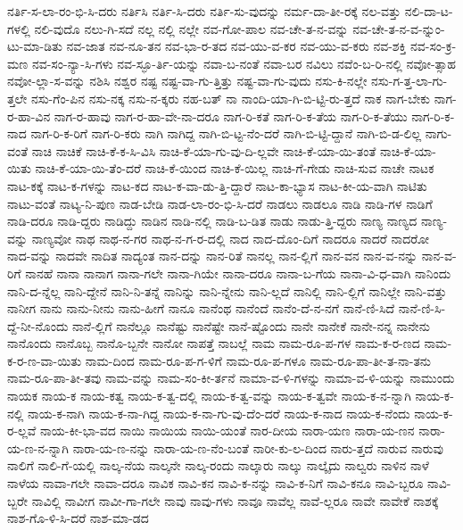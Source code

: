 {ನರ್ತಿ-ಸ-ಲಾ-ರಂ-ಭಿ-ಸಿ-ದರು
ನರ್ತಿಸಿ
ನರ್ತಿ-ಸಿ-ದರು
ನರ್ತಿ-ಸು-ವುದನ್ನು
ನರ್ಮ-ದಾ-ತೀ-ರಕ್ಕೆ
ನಲ-ವತ್ತು
ನಲಿ-ದಾ-ಟ-ಗಳಲ್ಲಿ
ನಲಿ-ವುದೊ
ನಲು-ಗಿ-ಸದೆ
ನಲ್ಲ
ನಲ್ಲಿ
ನಲ್ಲೇ
ನವ-ಗೋ-ಪಾಲ
ನವ-ಚೇ-ತ-ನ-ವನ್ನು
ನವ-ಚೇ-ತ-ನ-ವ-ನ್ನುಂ-ಟು-ಮಾ-ಡಿತು
ನವ-ಜಾತ
ನವ-ನೂ-ತನ
ನವ-ಭಾ-ರ-ತದ
ನವ-ಯು-ವ-ಕರ
ನವ-ಯು-ವ-ಕರು
ನವ-ಶಕ್ತಿ
ನವ-ಸಂ-ಕ್ರ-ಮಣ
ನವ-ಸಂ-ನ್ಯಾ-ಸಿ-ಗಳು
ನವ-ಸ್ಫೂ-ರ್ತಿ-ಯನ್ನು
ನವಾ-ಬ-ನಂತೆ
ನವಾ-ಬರ
ನವಿಲು
ನವೆಂ-ಬ-ರಿ-ನಲ್ಲಿ
ನವೋ-ತ್ಸಾಹ
ನವೋ-ಲ್ಲಾ-ಸ-ವನ್ನು
ನಶಿಸಿ
ನಶ್ವರ
ನಷ್ಟ
ನಷ್ಟ-ವಾ-ಗು-ತ್ತಿತ್ತು
ನಷ್ಟ-ವಾ-ಗು-ವುದು
ನಸು-ಕಿ-ನಲ್ಲೇ
ನಸು-ಗ-ತ್ತ-ಲಾ-ಗು-ತ್ತಲೇ
ನಸು-ಗೆಂ-ಪಿನ
ನಸು-ನಕ್ಕ
ನಸು-ನ-ಕ್ಕರು
ನಹ-ಬತ್
ನಾ
ನಾಂದಿ-ಯಾ-ಗಿ-ಬಿ-ಟ್ಟಿ-ರು-ತ್ತದೆ
ನಾಕ
ನಾಗ-ಬೇಕು
ನಾಗ-ರ-ಹಾ-ವಿನ
ನಾಗ-ರ-ಹಾವು
ನಾಗ-ರ-ಹಾ-ವೇ-ನಾ-ದರೂ
ನಾಗ-ರಿ-ಕತೆ
ನಾಗ-ರಿ-ಕ-ತೆಯ
ನಾಗ-ರಿ-ಕ-ತೆಯು
ನಾಗ-ರಿ-ಕ-ನಾದ
ನಾಗ-ರಿ-ಕ-ರಿಗೆ
ನಾಗ-ರಿ-ಕರು
ನಾಗಿ
ನಾಗಿದ್ದ
ನಾಗಿ-ಬಿ-ಟ್ಟ-ನೆಂ-ದರೆ
ನಾಗಿ-ಬಿ-ಟ್ಟಿ-ದ್ದಾನೆ
ನಾಗಿ-ಬಿ-ಡ-ಲಿಲ್ಲ
ನಾಗು-ವಂತೆ
ನಾಚಿ
ನಾಚಿಕೆ
ನಾಚಿ-ಕೆ-ಕ-ಸಿ-ವಿಸಿ
ನಾಚಿ-ಕೆ-ಯಾ-ಗು-ವು-ದಿ-ಲ್ಲವೇ
ನಾಚಿ-ಕೆ-ಯಾ-ಯಿ-ತಂತೆ
ನಾಚಿ-ಕೆ-ಯಾ-ಯಿತು
ನಾಚಿ-ಕೆ-ಯಾ-ಯಿ-ತೆಂ-ದರೆ
ನಾಚಿ-ಕೆ-ಯಿಂದ
ನಾಚಿ-ಕೆ-ಯಿಲ್ಲ
ನಾಚಿ-ಗೆ-ಗೇಡು
ನಾಚಿ-ಸುವ
ನಾಚೇ
ನಾಟಕ
ನಾಟ-ಕಕ್ಕೆ
ನಾಟ-ಕ-ಗಳನ್ನು
ನಾಟ-ಕದ
ನಾಟ-ಕ-ವಾ-ಡು-ತ್ತಿ-ದ್ದಾರೆ
ನಾಟ-ಕಾ-ಭ್ಯಾಸ
ನಾಟ-ಕೀ-ಯ-ವಾಗಿ
ನಾಟಿತು
ನಾಟು-ವಂತೆ
ನಾಟ್ಯ-ನಿ-ಪುಣ
ನಾಡ-ಬೇಡಿ
ನಾಡ-ಲಾ-ರಂ-ಭಿ-ಸಿ-ದರೆ
ನಾಡಲು
ನಾಡಲೂ
ನಾಡಿ
ನಾಡಿ-ಗಳ
ನಾಡಿಗೆ
ನಾಡಿ-ದರೂ
ನಾಡಿ-ದ್ದರು
ನಾಡಿದ್ದು
ನಾಡಿನ
ನಾಡಿ-ನಲ್ಲಿ
ನಾಡಿ-ಬ-ಡಿತ
ನಾಡು
ನಾಡು-ತ್ತಿ-ದ್ದರು
ನಾಣ್ಯ
ನಾಣ್ಯದ
ನಾಣ್ಯ-ವನ್ನು
ನಾಣ್ಯವೋ
ನಾಥ
ನಾಥ-ನ-ಗರ
ನಾಥ-ನ-ಗ-ರ-ದಲ್ಲಿ
ನಾದ
ನಾದ-ದೊಂ-ದಿಗೆ
ನಾದರೂ
ನಾದರೆ
ನಾದರೋ
ನಾದ-ವನ್ನು
ನಾದವೇ
ನಾದಿತ
ನಾದ್ಯಂತ
ನಾನ-ದನ್ನು
ನಾನ-ರಿತೆ
ನಾನಲ್ಲ
ನಾನ-ಲ್ಲಿಗೆ
ನಾನ-ವನ
ನಾನ-ವ-ನನ್ನು
ನಾನ-ವ-ರಿಗೆ
ನಾನಹೆ
ನಾನಾ
ನಾನಾಗ
ನಾನಾ-ಗಲೇ
ನಾನಾ-ಗಿಯೇ
ನಾನಾ-ದರೂ
ನಾನಾ-ಬ-ಗೆಯ
ನಾನಾ-ವಿ-ಧ-ವಾಗಿ
ನಾನಿಂದು
ನಾನಿ-ದ-ನ್ನೆಲ್ಲ
ನಾನಿ-ದ್ದೇನೆ
ನಾನಿ-ನಿ-ತನ್ನೆ
ನಾನಿನ್ನು
ನಾನಿ-ನ್ನೇನು
ನಾನಿ-ಲ್ಲದೆ
ನಾನಿಲ್ಲಿ
ನಾನಿ-ಲ್ಲಿಗೆ
ನಾನಿಲ್ಲೇ
ನಾನಿ-ವತ್ತು
ನಾನೀಗ
ನಾನು
ನಾನು-ನೀನು
ನಾನು-ಹೀಗೆ
ನಾನೂ
ನಾನೆಂಥ
ನಾನೆಂದೆ
ನಾನೆಂ-ದೆ-ನ-ನಗೆ
ನಾನೆ-ಣಿ-ಸಿದೆ
ನಾನೆ-ಣಿ-ಸಿ-ದ್ದೆ-ನೀ-ನೊಂದು
ನಾನೆ-ಲ್ಲಿಗೆ
ನಾನೆಲ್ಲೂ
ನಾನೆಷ್ಟು
ನಾನೆಷ್ಟೇ
ನಾನೆ-ಷ್ಟೊಂದು
ನಾನೇ
ನಾನೇಕೆ
ನಾನೇ-ನನ್ನ
ನಾನೇನು
ನಾನೊಂದು
ನಾನೊಬ್ಬ
ನಾನೊ-ಬ್ಬನೇ
ನಾನೋ
ನಾಪತ್ತೆ
ನಾಬಲ್ಲೆ
ನಾಮ
ನಾಮ-ರೂ-ಪ-ಗಳ
ನಾಮ-ಕ-ರ-ಣದ
ನಾಮ-ಕ-ರ-ಣ-ವಾ-ಯಿತು
ನಾಮ-ದಿಂದ
ನಾಮ-ರೂ-ಪ-ಗ-ಳಿಗೆ
ನಾಮ-ರೂ-ಪ-ಗಳೂ
ನಾಮ-ರೂ-ಪಾ-ತೀ-ತ-ನಾ-ತನು
ನಾಮ-ರೂ-ಪಾ-ತೀ-ತವು
ನಾಮ-ವನ್ನು
ನಾಮ-ಸಂ-ಕೀ-ರ್ತನೆ
ನಾಮಾ-ವ-ಳಿ-ಗಳನ್ನು
ನಾಮಾ-ವ-ಳಿ-ಯನ್ನು
ನಾಮುಂದು
ನಾಯಕ
ನಾಯ-ಕ
ನಾಯ-ಕತ್ವ
ನಾಯ-ಕ-ತ್ವ-ದಲ್ಲಿ
ನಾಯ-ಕ-ತ್ವ-ವನ್ನು
ನಾಯ-ಕ-ತ್ವವೇ
ನಾಯ-ಕ-ನ-ನ್ನಾಗಿ
ನಾಯ-ಕ-ನಲ್ಲಿ
ನಾಯ-ಕ-ನಾಗಿ
ನಾಯ-ಕ-ನಾ-ಗಿದ್ದ
ನಾಯ-ಕ-ನಾ-ಗು-ವು-ದೆಂ-ದರೆ
ನಾಯ-ಕ-ನಾದ
ನಾಯ-ಕ-ನೆಂದು
ನಾಯ-ಕ-ರ-ಲ್ಲವೆ
ನಾಯ-ಕೀ-ಭಾ-ವದ
ನಾಯಿ
ನಾಯಿಯ
ನಾಯಿ-ಯಂತೆ
ನಾರ-ದೀಯ
ನಾರಾ-ಯಣ
ನಾರಾ-ಯ-ಣನ
ನಾರಾ-ಯ-ಣ-ನ-ನ್ನಾಗಿ
ನಾರಾ-ಯ-ಣ-ನನ್ನು
ನಾರಾ-ಯ-ಣ-ನೆಂ-ಬಂತೆ
ನಾರೀ-ಕು-ಲ-ದಿಂದ
ನಾರು-ತ್ತದೆ
ನಾರುವ
ನಾರುವು
ನಾಲಿಗೆ
ನಾಲಿ-ಗೆ-ಯಲ್ಲಿ
ನಾಲ್ಕ-ನೆಯ
ನಾಲ್ಕನೇ
ನಾಲ್ಕ-ರಂದು
ನಾಲ್ಕಾರು
ನಾಲ್ಕು
ನಾಲ್ಕೈದು
ನಾಲ್ವರು
ನಾಳಿನ
ನಾಳೆ
ನಾಳೆಯ
ನಾವಾ-ಗಲೇ
ನಾವಾ-ದರೂ
ನಾವಿಕ
ನಾವಿ-ಕನ
ನಾವಿ-ಕ-ನನ್ನು
ನಾವಿ-ಕ-ನಿಗೆ
ನಾವಿ-ಕನೂ
ನಾವಿ-ಬ್ಬರೂ
ನಾವಿ-ಬ್ಬರೇ
ನಾವಿಲ್ಲಿ
ನಾವೀಗ
ನಾವೀ-ಗಾ-ಗಲೇ
ನಾವು
ನಾವು-ಗಳು
ನಾವೂ
ನಾವೆಲ್ಲ
ನಾವೆ-ಲ್ಲರೂ
ನಾವೇ
ನಾವೇಕೆ
ನಾಶಕ್ಕೆ
ನಾಶ-ಗೊ-ಳಿ-ಸಿ-ದರೆ
ನಾಶ-ಮಾ-ಡದ
}
